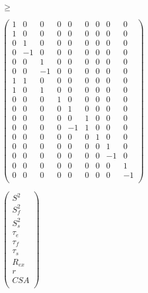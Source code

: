 \documentclass[a4paper,11pt,twoside,openright]{book}
\def\lthtmlcheckvsize{\ifdim\ht\sizebox<\vsize 
  \ifdim\wd\sizebox<\hsize\expandafter\hfill\fi \expandafter\vfill
  \else\expandafter\vss\fi}%
\begin{document}
{\newpage\clearpage
{}%
$ \geqslant$%
\lthtmlindisplaymathZ
\lthtmlcheckvsize\clearpage}

{\newpage\clearpage
{}%
$\displaystyle \begin{pmatrix}
1 & 0 & 0 & 0 & 0 & 0 & 0 & 0 & 0 \\
1 & 0 & 0 & 0 & 0 & 0 & 0 & 0 & 0 \\
0 & 1 & 0 & 0 & 0 & 0 & 0 & 0 & 0 \\
0 &-1 & 0 & 0 & 0 & 0 & 0 & 0 & 0 \\
0 & 0 & 1 & 0 & 0 & 0 & 0 & 0 & 0 \\
0 & 0 &-1 & 0 & 0 & 0 & 0 & 0 & 0 \\
1 & 1 & 0 & 0 & 0 & 0 & 0 & 0 & 0 \\
1 & 0 & 1 & 0 & 0 & 0 & 0 & 0 & 0 \\
0 & 0 & 0 & 1 & 0 & 0 & 0 & 0 & 0 \\
0 & 0 & 0 & 0 & 1 & 0 & 0 & 0 & 0 \\
0 & 0 & 0 & 0 & 0 & 1 & 0 & 0 & 0 \\
0 & 0 & 0 & 0 &-1 & 1 & 0 & 0 & 0 \\
0 & 0 & 0 & 0 & 0 & 0 & 1 & 0 & 0 \\
0 & 0 & 0 & 0 & 0 & 0 & 0 & 1 & 0 \\
0 & 0 & 0 & 0 & 0 & 0 & 0 &-1 & 0 \\
0 & 0 & 0 & 0 & 0 & 0 & 0 & 0 & 1 \\
0 & 0 & 0 & 0 & 0 & 0 & 0 & 0 &-1 \\
\end{pmatrix}$%
\lthtmlindisplaymathZ
\lthtmlcheckvsize\clearpage}

{\newpage\clearpage
{}%
$\displaystyle \begin{pmatrix}
S^2 \\
S^2_f \\
S^2_s \\
\tau_e \\
\tau_f \\
\tau_s \\
R_{ex} \\
r \\
CSA \\
\end{pmatrix}$%
\lthtmlindisplaymathZ
\lthtmlcheckvsize\clearpage}
\end{document}
